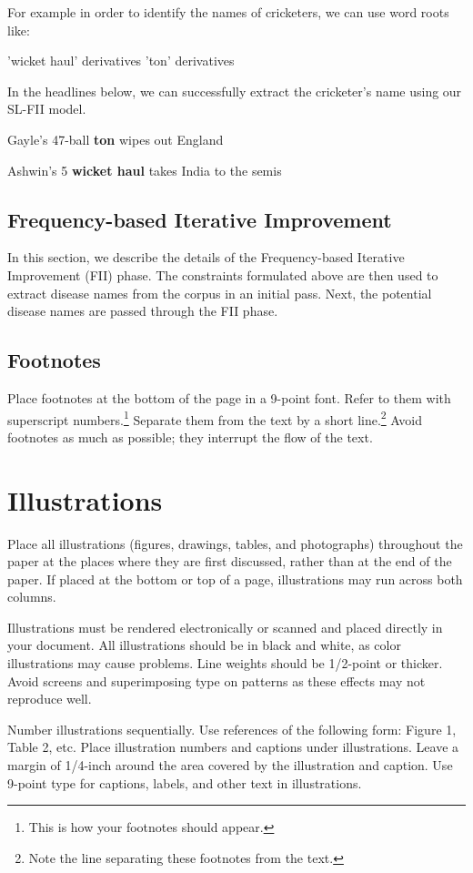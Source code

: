 \documentclass{article}
\begin{document}
For example in order to identify the names of cricketers, we can use word roots like:

'wicket haul' derivatives
'ton' derivatives

In the headlines below, we can successfully extract the cricketer's name using our SL-FII model.

Gayle's 47-ball \textbf{ton} wipes out England 

Ashwin's 5 \textbf{wicket haul} takes India to the semis


\subsection{Frequency-based Iterative Improvement}

In this section, we describe the details of the Frequency-based Iterative Improvement (FII) phase. 
The constraints formulated above are then used to extract disease names from the corpus in an initial pass. Next, the potential disease names are passed through the FII phase.


\subsection{Footnotes}

Place footnotes at the bottom of the page in a 9-point font.  Refer to
them with superscript numbers.\footnote{This is how your footnotes
should appear.} Separate them from the text by a short
line.\footnote{Note the line separating these footnotes from the
text.} Avoid footnotes as much as possible; they interrupt the flow of
the text.

\section{Illustrations}

Place all illustrations (figures, drawings, tables, and photographs)
throughout the paper at the places where they are first discussed,
rather than at the end of the paper. If placed at the bottom or top of
a page, illustrations may run across both columns.

Illustrations must be rendered electronically or scanned and placed
directly in your document. All illustrations should be in black and
white, as color illustrations may cause problems. Line weights should
be 1/2-point or thicker. Avoid screens and superimposing type on
patterns as these effects may not reproduce well.

Number illustrations sequentially. Use references of the following
form: Figure 1, Table 2, etc. Place illustration numbers and captions
under illustrations. Leave a margin of 1/4-inch around the area
covered by the illustration and caption.  Use 9-point type for
captions, labels, and other text in illustrations.
\end{document}
